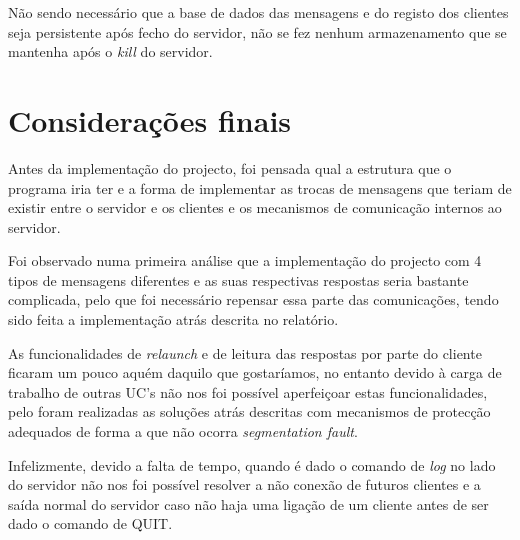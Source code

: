 \documentclass[a4paper]{article}
\begin{document}
Não sendo necessário que a base de dados das mensagens e do registo dos clientes seja persistente após fecho do servidor, não se fez nenhum armazenamento que se mantenha após o \textit{kill} do servidor.

\section{Considerações finais}
Antes da implementação do projecto, foi pensada qual a estrutura que o programa iria ter e a forma de implementar as trocas de mensagens que teriam de existir entre o servidor e os clientes e os mecanismos de comunicação internos ao servidor.

Foi observado numa primeira análise que a implementação do projecto com 4 tipos de mensagens diferentes e as suas respectivas respostas seria bastante complicada, pelo que foi necessário repensar essa parte das comunicações, tendo sido feita a implementação atrás descrita no relatório.

As funcionalidades de \textit{relaunch} e de leitura das respostas por parte do cliente ficaram um pouco aquém daquilo que gostaríamos, no entanto devido à carga de trabalho de outras UC's não nos foi possível aperfeiçoar estas funcionalidades, pelo foram realizadas as soluções atrás descritas com mecanismos de protecção adequados de forma a que não ocorra \textit{segmentation fault}.

Infelizmente, devido a falta de tempo, quando é dado o comando de \textit{log} no lado do servidor não nos foi possível resolver a não conexão de futuros clientes e a saída normal do servidor caso não haja uma ligação de um cliente antes de ser dado o comando de QUIT.
\end{document}
